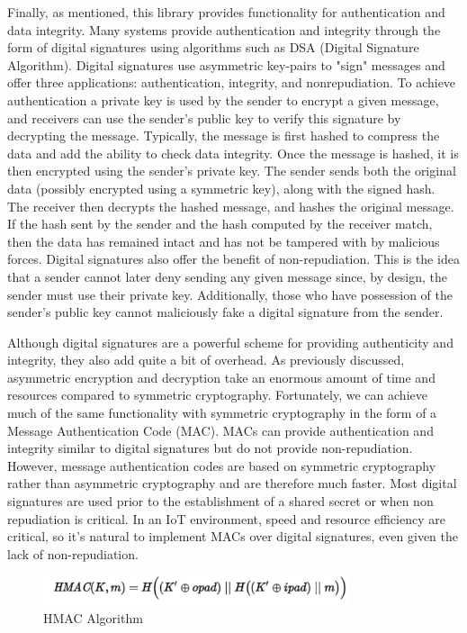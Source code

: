 Finally, as mentioned, this library provides functionality for authentication and data integrity. Many systems provide authentication and integrity through the form of digital signatures using algorithms such as DSA (Digital Signature Algorithm). Digital signatures use asymmetric key-pairs to "sign" messages and offer three applications: authentication, integrity, and nonrepudiation. To achieve authentication a private key is used by the sender to encrypt a given message, and receivers can use the sender's public key to verify this signature by decrypting the message. Typically, the message is first hashed to compress the data and add the ability to check data integrity. Once the message is hashed, it is then encrypted using the sender's private key.  The sender sends both the original data (possibly encrypted using a symmetric key), along with the signed hash. The receiver then decrypts the hashed message, and hashes the original message. If the hash sent by the sender and the hash computed by the receiver match, then the data has remained intact and has not be tampered with by malicious forces. Digital signatures also offer the benefit of non-repudiation. This is the idea that a sender cannot later deny sending any given message since, by design, the sender must use their private key. Additionally, those who have possession of the sender's public key cannot maliciously fake a digital signature from the sender.

Although digital signatures are a powerful scheme for providing authenticity and integrity, they also add quite a bit of overhead. As previously discussed, asymmetric encryption and decryption take an enormous amount of time and resources compared to symmetric cryptography. Fortunately, we can achieve much of the same functionality with symmetric cryptography in the form of a Message Authentication Code (MAC). MACs can provide authentication and integrity similar to digital signatures but do not provide non-repudiation. However, message authentication codes are based on symmetric cryptography rather than asymmetric cryptography and are therefore much faster. Most digital signatures are used prior to the establishment of a shared secret or when non repudiation is critical. In an IoT environment, speed and resource efficiency are critical, so it's natural to implement MACs over digital signatures, even given the lack of non-repudiation. 

 \begin{figure}[t]
	\centering
	\includegraphics[width=9cm,height=0.7\textheight,keepaspectratio]{./figures/figure_5}
	\center\caption[font=footnote]{HMAC Algorithm}
\end{figure}

